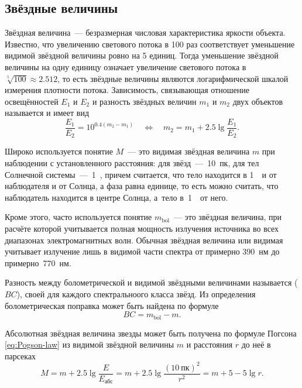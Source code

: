 \subsection{Звёздные величины}

Звёздная величина~--- безразмерная числовая характеристика яркости объекта. Известно, что увеличению светового потока в 100 раз соответствует уменьшение видимой звёздной величины ровно на 5 единиц. Тогда уменьшение звёздной величины на одну единицу означает увеличение светового потока в $\sqrt[5]{100}\approx 2.512$, то есть звёздные величины являются логарифмической шкалой измерения плотности потока. Зависимость, связывающая отношение освещённостей $E_1$ и $E_2$ и разность звёздных величин $m_1$ и $m_2$ двух объектов называется  и имеет вид
\begin{equation}
	\frac{E_1}{E_2} = 10^{0.4(m_2 - m_1)} \quad \Longleftrightarrow \quad m_2 = m_1 + 2.5 \lg \frac{E_1}{E_2}.
	\label{eq:Pogson-law}
\end{equation}

Широко используется понятие  $M$~--- это видимая звёздная величина $m$ при наблюдении с установленного расстояния: для звёзд~---~10~пк, для тел Солнечной системы~---~1~\au, причем считается, что тело находится в 1~\au~и от наблюдателя и от Солнца, а фаза равна единице, то есть можно считать, что наблюдатель находится в центре Солнца, а~тело в~1~\au~от него. 

Кроме этого, часто используется понятие  $m_\text{bol}$~--- это звёздная величина, при расчёте которой учитывается полная мощность излучения источника во всех диапазонах электромагнитных волн. Обычная звёздная величина или видимая учитывает излучение лишь в видимой части спектра от примерно 390~нм до примерно~770~нм.

Разность между болометрической и видимой звёздными величинами называется  ($BC$), своей для каждого спектральноого класса звёзд. Из определения болометрическая поправка может быть найдена по формуле
\begin{equation}
	BC = m_\text{bol} - m.
\end{equation}


Абсолютная звёздная величина звезды может быть получена по формуле Погсона \eqref{eq:Pogson-law} из видимой звёздной величины $m$ и расстояния $r$ до неё в парсеках
\begin{equation}
	M = m + 2.5 \lg \frac{E}{E_\text{абс}} = m + 2.5 \lg \frac{(10~\text{пк})^2}{r^2} = m + 5 - 5\lg r.
\end{equation} 